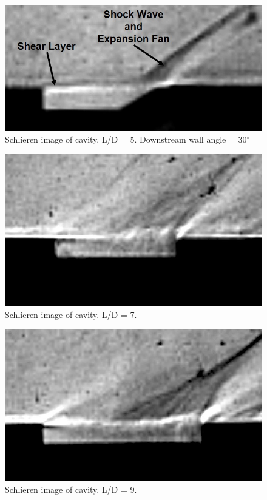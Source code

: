 \begin{figure}
\centering
\includegraphics[width = \textwidth]{Figures/5-30.jpg}
\caption[Schlieren image of cavity with angled downstream wall. L/D = 5.]{Schlieren image of cavity. L/D = 5. Downstream wall angle = 30$^\circ$}
\label{fig:5-30}
\end{figure}

\begin{figure}
\centering
\includegraphics[width = \textwidth]{Figures/7.jpg}
\caption[Schlieren image of cavity. L/D = 7.]{Schlieren image of cavity. L/D = 7.}
\label{fig:7}
\end{figure}

\begin{figure}
\centering
\includegraphics[width = \textwidth]{Figures/9.jpg}
\caption[Schlieren image of cavity. L/D = 9.]{Schlieren image of cavity. L/D = 9.}
\label{fig:9}
\end{figure}

